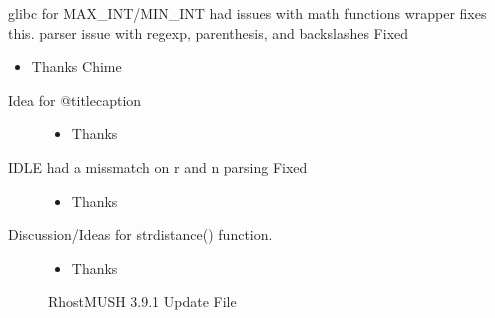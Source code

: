 \documentclass[letterpaper,10pt,english]{sphinxmanual}
\begin{document}
\sphinxAtStartPar
glibc for MAX\_INT/MIN\_INT had issues with math functions \sphinxhyphen{} wrapper fixes this.
parser issue with regexp, parenthesis, and backslashes \textendash{} Fixed
\begin{itemize}
\item {} 
\sphinxAtStartPar
Thanks Chime

\end{itemize}
\begin{description}
\item[{Idea for @titlecaption}] \leavevmode\begin{itemize}
\item {} 
\sphinxAtStartPar
Thanks 

\end{itemize}

\item[{IDLE had a missmatch on r and n parsing \textendash{} Fixed}] \leavevmode\begin{itemize}
\item {} 
\sphinxAtStartPar
Thanks 

\end{itemize}

\item[{Discussion/Ideas for strdistance() function.}] \leavevmode\begin{itemize}
\item {} 
\sphinxAtStartPar
Thanks 

\end{itemize}

\sphinxAtStartPar
RhostMUSH 3.9.1 Update File

\end{description}
\end{document}
